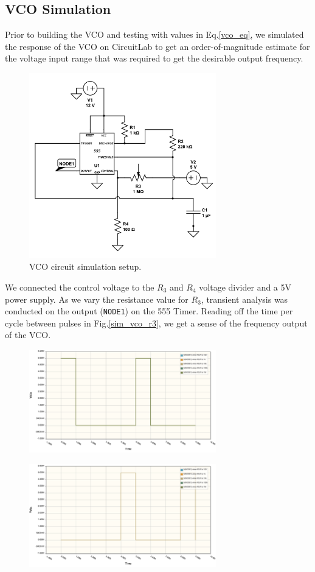 \documentclass[twocolumn]{article}
\begin{document}
\subsection{VCO Simulation}
Prior to building the VCO and testing with values in Eq.\ref{vco_eq}, we simulated the response of the VCO on CircuitLab to get an order-of-magnitude estimate for the voltage input range that was required to get the desirable output frequency.
\begin{figure}[h!]
 \centering
 \includegraphics[width=230pt]{figure/vco_sim.png}
\caption{VCO circuit simulation setup.}
\label{vco_sim}
\end{figure}
\par We connected the control voltage to the $R_3$ and $R_4$ voltage divider  and a 5V power supply. As we vary the resistance value for $R_3$, transient analysis was conducted on the output (\texttt{NODE1}) on the 555 Timer. Reading off the time per cycle between pulses in Fig.\ref{sim_vco_r3}, we get a sense of the frequency output of the VCO. 
 \newpage
\begin{figure}[h!]
 \centering
 \includegraphics[width=230pt]{figure/sim_1m.png}
\end{figure}
\begin{figure}[h!]
 \centering
  \includegraphics[width=230pt]{figure/sim_10k.png}
\end{figure}
\end{document}
